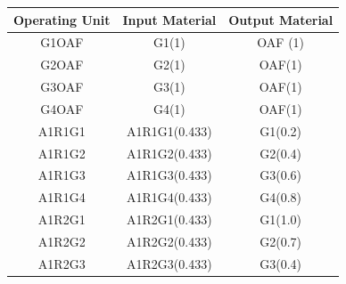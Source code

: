 \begin{table}[]
\centering
\begin{tabular}{@{}ccc@{}}
\toprule
\textbf{Operating Unit} & \textbf{Input Material} & \textbf{Output Material}                                                                              \\ \midrule
G1OAF                   & G1(1)                   & OAF (1)                                                                                               \\
G2OAF                   & G2(1)                   & OAF(1)                                                                                                \\
G3OAF                   & G3(1)                   & OAF(1)                                                                                                \\
G4OAF                   & G4(1)                   & OAF(1)                                                                                                \\ \midrule
A1R1G1                  & A1R1G1(0.433)           & G1(0.2)                                                                                               \\
A1R1G2                  & A1R1G2(0.433)           & G2(0.4)                                                                                               \\
A1R1G3                  & A1R1G3(0.433)           & G3(0.6)                                                                                               \\
A1R1G4                  & A1R1G4(0.433)           & G4(0.8)                                                                                               \\
A1R2G1                  & A1R2G1(0.433)           & G1(1.0)                                                                                               \\
A1R2G2                  & A1R2G2(0.433)           & G2(0.7)                                                                                               \\
A1R2G3                  & A1R2G3(0.433)           & G3(0.4)                                                                                               \\

\end{tabular}
\end{table}
